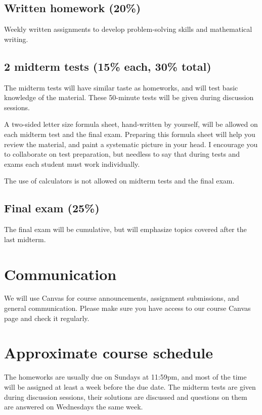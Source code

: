 \documentclass[oneside,11pt]{amsart}
\begin{document}
\subsection{Written homework (20\%)} Weekly written assignments to develop problem-solving skills and mathematical writing.

\subsection{2 midterm tests (15\% each, 30\% total)}

The midterm tests will have similar taste as homeworks, and will test basic knowledge of the material. These 50-minute tests will be given during discussion sessions.

A two-sided letter size formula sheet, hand-written by yourself, will be allowed on each midterm test and the final exam. Preparing this formula sheet will help you review the material, and paint a systematic picture in your head. I encourage you to collaborate on test preparation, but needless to say that during tests and exams each student must work individually.

The use of calculators is not allowed on midterm tests and the final exam.

\subsection{Final exam (25\%)}
The final exam will be cumulative, but will emphasize topics covered after the last midterm.

\section{Communication} \label{comm} 

We will use Canvas for course announcements, assignment submissions, and general communication. Please make sure you have access to our course Canvas page and check it regularly.

\section{Approximate course schedule}

The homeworks are usually due on Sundays at 11:59pm, and most of the time will be assigned at least a week before the due date. The midterm tests are given during discussion sessions, their solutions are discussed and questions on them are answered on Wednesdays the same week.
\end{document}
